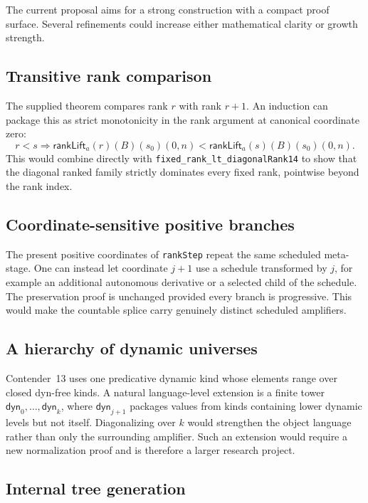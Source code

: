 \documentclass[11pt]{article}
\theoremstyle{definition}
\theoremstyle{remark}
\newcommand{\lean}[1]{\texttt{#1}}
\begin{document}
The current proposal aims for a strong construction with a compact proof
surface.  Several refinements could increase either mathematical clarity or
growth strength.

\subsection{Transitive rank comparison}

The supplied theorem compares rank \(r\) with rank \(r+1\).  An induction can
package this as strict monotonicity in the rank argument at canonical
coordinate zero:
\[
  r<s\Longrightarrow
  \mathsf{rankLift}_a(r)(B)(s_0)(0,n)
  <
  \mathsf{rankLift}_a(s)(B)(s_0)(0,n).
\]
This would combine directly with
\lean{fixed\_rank\_lt\_diagonalRank14} to show that the diagonal ranked family
strictly dominates every fixed rank, pointwise beyond the rank index.

\subsection{Coordinate-sensitive positive branches}

The present positive coordinates of \lean{rankStep} repeat the same scheduled
meta-stage.  One can instead let coordinate \(j+1\) use a schedule transformed
by \(j\), for example an additional autonomous derivative or a selected child
of the schedule.  The preservation proof is unchanged provided every branch
is progressive.  This would make the countable splice carry genuinely distinct
scheduled amplifiers.

\subsection{A hierarchy of dynamic universes}

Contender~13 uses one predicative dynamic kind whose elements range over
closed dyn-free kinds.  A natural language-level extension is a finite tower
\(\mathsf{dyn}_0,\ldots,\mathsf{dyn}_k\), where
\(\mathsf{dyn}_{j+1}\) packages values from kinds containing lower dynamic
levels but not itself.  Diagonalizing over \(k\) would strengthen the object
language rather than only the surrounding amplifier.  Such an extension would
require a new normalization proof and is therefore a larger research project.

\subsection{Internal tree generation}
\end{document}

